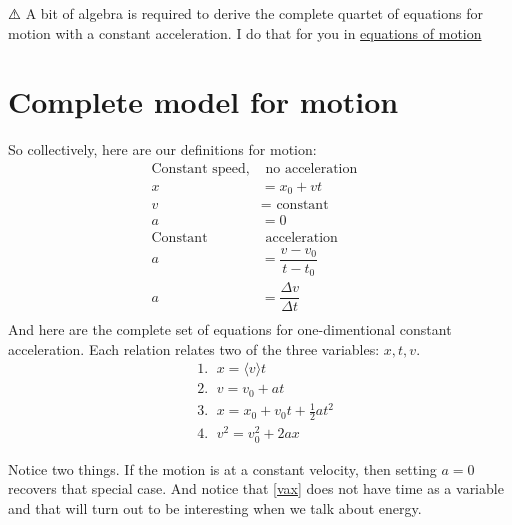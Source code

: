 \documentclass[
  letterpaper,
  DIV=11,
  numbers=noendperiod,
  oneside]{scrreprt}
\begin{document}
\begin{tcolorbox}[enhanced jigsaw, colbacktitle=quarto-callout-warning-color!10!white, rightrule=.15mm, toptitle=1mm, arc=.35mm, breakable, left=2mm, title={Warning}, colframe=quarto-callout-warning-color-frame, bottomrule=.15mm, colback=white, titlerule=0mm, leftrule=.75mm, toprule=.15mm, coltitle=black, opacityback=0, opacitybacktitle=0.6, bottomtitle=1mm]

⚠️ A bit of algebra is required to derive the complete quartet of
equations for motion with a constant acceleration. I do that for you in
\href{./Motion_equations.qmd}{equations of motion}

\end{tcolorbox}

\section{Complete model for motion}\label{sec-equationsofmotion}

So collectively, here are our definitions for motion: \[
\begin{align}
\text{Constant speed,}&\text{ no acceleration} \nonumber \\
x &= x_0 + vt \nonumber \\
v &= \text{ constant} \nonumber \\
a &= 0 \nonumber \\
\text{Constant}&\text{ acceleration}& \nonumber \\
a &=\dfrac{v-v_0}{t-t_0} \nonumber \\
a &= \dfrac{\Delta v}{\Delta t} \nonumber \\
\end{align}
\] And here are the complete set of equations for one-dimentional
constant acceleration. Each relation relates two of the three variables:
\(x, t, v\). \[
\begin{align}
& \text{1. } \; x = \langle v \rangle t \label{avev} \\ 
& \text{2.  } \; v   = v_0 + at \label{vat} \\
& \text{3. }  \; x   = x_0+v_0 t + \frac{1}{2} at^2 \label{xat}  \\
& \text{4. }\; v^2   = v_0^2 + 2ax \label{vax} 
\end{align}
\]

Notice two things. If the motion is at a constant velocity, then setting
\(a=0\) recovers that special case. And notice that \eqref{vax} does not
have time as a variable and that will turn out to be interesting when we
talk about energy.
\end{document}

